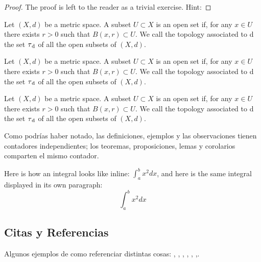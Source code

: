 \begin{proof}
    The proof is left to the reader as a trivial exercise. Hint: \blindtext
\end{proof}

\begin{definition}
Let $(X, d)$ be a metric space. A subset $U \subset X$ is an open set if, for any $x \in U$ there exists $r > 0$ such that $B(x, r) \subset U$. We call the topology associated to d the set $\tau\textsubscript{d}$ of all the open subsets of $(X, d).$
\end{definition}

\begin{example}
    Let $(X, d)$ be a metric space. A subset $U \subset X$ is an open set if, for any $x \in U$ there exists $r > 0$ such that $B(x, r) \subset U$. We call the topology associated to d the set $\tau\textsubscript{d}$ of all the open subsets of $(X, d).$
\end{example}

\begin{remark}
    Let $(X, d)$ be a metric space. A subset $U \subset X$ is an open set if, for any $x \in U$ there exists $r > 0$ such that $B(x, r) \subset U$. We call the topology associated to d the set $\tau\textsubscript{d}$ of all the open subsets of $(X, d).$
\end{remark}

Como podrías haber notado, las definiciones, ejemplos y las observaciones tienen contadores independientes; los teoremas, proposiciones, lemas y corolarios comparten el mismo contador.

\begin{remark}
    Here is how an integral looks like inline: $\int_{a}^{b} x^2 dx$, and here is the same integral displayed in its own paragraph: \[\int_{a}^{b} x^2 dx\]
\end{remark}

\subsection{Citas y Referencias}
Algunos ejemplos de como referenciar distintas cosas: , , , , , ,. 

